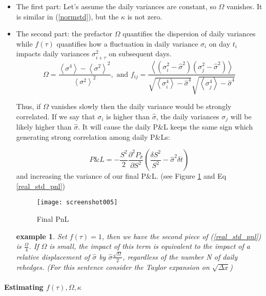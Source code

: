 \documentclass[a4]{article}
\newtheorem{example}{example}
\begin{document}
\begin{itemize}
\item The first part: Let's assume the daily variances are constant, so $\Omega$ vanishes. It is similar in (\ref{normstd}), but the $\kappa$ is not zero.\\
\item The second part: the prefactor $\Omega$ quantifies the dispersion of daily variances while $f(\tau)$ quantifies how a fluctuation in daily variance $\sigma_{i}$ on day $t_{i}$ impacts daily variances $\sigma_{i+\tau}^{2}$ on subsequent days.
\begin{equation}
\Omega=\frac{\left\langle\sigma^{4}\right\rangle-\left\langle\sigma^{2}\right\rangle^{2}}{\left\langle\sigma^{2}\right\rangle^{2}}, \text{ and } f_{i j}=\frac{\left\langle\left(\sigma_{i}^{2}-\widehat{\sigma}^{2}\right)\left(\sigma_{j}^{2}-\widehat{\sigma}^{2}\right)\right\rangle}{\sqrt{\left\langle\sigma_{i}^{4}\right\rangle-\widehat{\sigma}^{4}} \sqrt{\left\langle\sigma_{j}^{4}\right\rangle-\widehat{\sigma}^{4}}}
\end{equation}\par 
Thus, if $\Omega$ vanishes slowly then the daily variance would be strongly correlated. If we say that $\sigma_{i}$ is higher than $\hat{\sigma}$, the daily variances $\sigma_{j}$ will be likely higher than $\hat{\sigma}$. It will cause the daily P\&L keeps the same sign which generating strong correlation among daily P\&Ls:\par 
\begin{equation}\label{PnL_vol}
P\&L = -\dfrac{S^{2}}{2}\dfrac{\partial^{2}P_{\hat{\sigma}}}{\partial S^{2}}\left(\dfrac{\delta S^{2}}{S^{2}}-\hat{\sigma}^{2}\delta t\right)
\end{equation}
and increasing the variance of our final P\&L. (see Figure \ref{fig:screenshot005} and Eq \ref{real_std_pnl})
\begin{figure}\label{fig1}
	\centering
	\texttt{[image: screenshot005]}
	\caption{Final PnL}
	\label{fig:screenshot005}
\end{figure}
\begin{example}
	Set $f(\tau)=1$, then we have the second piece of (\ref{real_std_pnl}) is $\frac{\Omega}{4}$. If $\Omega$ is small, the impact of this term is equivalent to the impact of a relative displacement of $\hat{\sigma}$ by $\hat{\sigma}\frac{\sqrt{\Omega}}{2}$, regardless of the number N of daily rehedges. (For this sentence consider the Taylor expansion on $\sqrt{\Delta x}$)
\end{example}
\end{itemize}
\paragraph{Estimating $f(\tau), \Omega, \kappa$}
\end{document}
